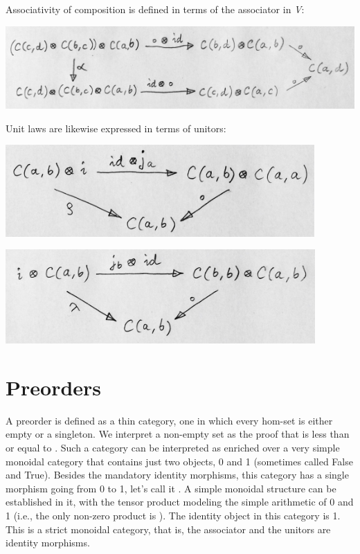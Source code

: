 Associativity of composition is defined in terms of the associator in
\emph{V}:

\includegraphics[width=5.35417in]{images/compcoherence.jpg}

Unit laws are likewise expressed in terms of unitors:

\includegraphics[width=4.64583in]{images/rightid.jpg}

\includegraphics[width=4.65625in]{images/leftid.jpg}

\section{Preorders}\label{preorders}

A preorder is defined as a thin category, one in which every hom-set is
either empty or a singleton. We interpret a non-empty set
 as the proof that  is less than or equal to
. Such a category can be interpreted as enriched over a very
simple monoidal category that contains just two objects, 0 and 1
(sometimes called False and True). Besides the mandatory identity
morphisms, this category has a single morphism going from 0 to 1, let's
call it . A simple monoidal structure can be
established in it, with the tensor product modeling the simple
arithmetic of 0 and 1 (i.e., the only non-zero product is ).
The identity object in this category is 1. This is a strict monoidal
category, that is, the associator and the unitors are identity
morphisms.

